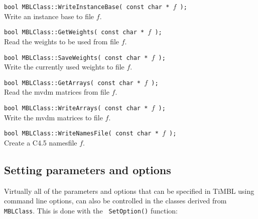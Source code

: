 \documentclass{report}
\begin{document}
\begin{description}
\item {\tt bool MBLClass::WriteInstanceBase( const char * $f$ );}\\
Write an instance base to file $f$.

\item {\tt bool MBLClass::GetWeights( const char * $f$ );}\\ Read the
weights to be used from file $f$.

\item {\tt bool MBLClass::SaveWeights( const char * $f$ );}\\
Write the currently used weights to file $f$.

\item {\tt bool MBLClass::GetArrays( const char * $f$ );}\\
Read the {\sc mvdm} matrices from file $f$.

\item {\tt bool MBLClass::WriteArrays( const char * $f$ );}\\
Write the {\sc mvdm} matrices to file $f$.

\item {\tt bool MBLClass::WriteNamesFile( const char * $f$ );}\\
Create a C4.5 namesfile $f$.

\end{description}

\subsection{Setting parameters and options}

Virtually all of the parameters and options that can be specified in
TiMBL using command line options, can also be controlled in the
classes derived from {\tt MBLClass}. This is done with the {\tt
SetOption()} function:
\end{document}
